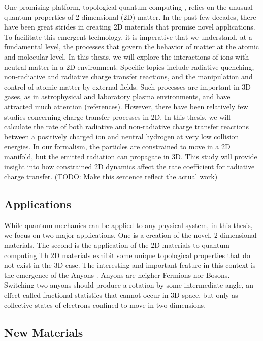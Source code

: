 One promising platform, topological quantum computing \cite{Tqc1,Tqc2,Tqc3, Tqc4, Tqc5}, relies on the unusual quantum properties of 2-dimensional (2D) matter. In the past few decades, there have been great strides in creating 2D materials that promise novel applications.\cite{Nature2D}
To facilitate this emergent technology, it is imperative that we understand, at a fundamental level, the processes that govern the behavior of matter at the atomic and molecular level. In this thesis, we will explore the interactions of ions with neutral matter in a 2D environment. Specific topics include radiative quenching, non-radiative and radiative charge transfer reactions, and the manipulation and control of atomic matter by external fields. Such processes are important in 3D gases,
as in astrophysical and laboratory plasma environments, and have attracted much attention
(references). However, there have been relatively few studies concerning charge transfer processes in 2D.
In this thesis, we will calculate the rate of both radiative 
and non-radiative charge transfer reactions between a positively charged ion and neutral hydrogen at very low collision energies. In our formalism, the particles are constrained to move in a 2D manifold, but the emitted radiation can propagate in 3D. This study will provide insight into how constrained 2D dynamics affect the rate coefficient for radiative charge transfer.
 (TODO: Make this sentence reflect the actual work)

\subsection{Applications}
 While quantum mechanics can be applied to any physical system, in this thesis, we focus on two major applications.
 One is a creation of the novel, 2-dimensional materials.
 The second is the application of the 2D materials to quantum computing 
 Th 2D materials exhibit some unique topological properties that do not exist in the 3D case. The interesting and important feature in this context is the emergence of the Anyons \cite{anyonsR}. Anyons are neigher Fermions nor Bosons. Switching two anyons should produce a rotation by some intermediate angle, an effect called fractional statistics that cannot occur in 3D space, but only as collective states of electrons confined to move in two dimensions.
\subsection*{New Materials}


